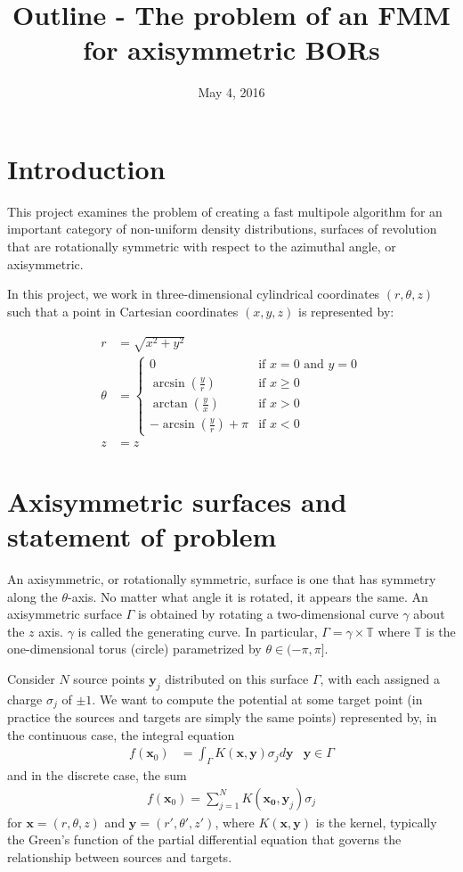 \documentclass[11pt, oneside]{article}   	%
\title{Outline - The problem of an FMM for axisymmetric BORs}
\date{May 4, 2016}
\begin{document}
\maketitle

\section{Introduction}
This project examines the problem of creating a fast multipole algorithm for an important category of non-uniform density distributions, surfaces of revolution that are rotationally symmetric with respect to the azimuthal angle, or axisymmetric.

In this project, we work in three-dimensional cylindrical coordinates $(r,\theta,z)$ such that a point in Cartesian coordinates $(x,y,z)$ is represented by:

\begin{align}
r &= \sqrt{x^2+y^2}\\
\theta &=   \begin{cases}
    0 & \mbox{if } x = 0 \mbox{ and } y = 0\\
    \arcsin(\frac{y}{r}) & \mbox{if } x \geq 0 \\	
    \arctan(\frac{y}{x}) & \mbox{if } x > 0 \\	
    -\arcsin(\frac{y}{r}) + \pi & \mbox{if } x < 0
  \end{cases}\\
z &= z
\end{align}

\section{Axisymmetric surfaces and statement of problem}

An axisymmetric, or rotationally symmetric, surface is one that has symmetry along the $\theta$-axis. No matter what angle it is rotated, it appears the same. An axisymmetric surface $\Gamma$ is obtained by rotating a two-dimensional curve $\gamma$ about the $z$ axis. $\gamma$ is called the generating curve. In particular, $\Gamma=\gamma\times\mathbb{T}$ where $\mathbb{T}$ is the one-dimensional torus (circle) parametrized by $\theta\in(-\pi,\pi]$.

Consider $N$ source points $\mathbf{y}_j$ distributed on this surface $\Gamma$, with each assigned a charge $\sigma_j$ of $\pm 1$. We want to compute the potential at some target point (in practice the sources and targets are simply the same points) represented by, in the continuous case, the integral equation
\begin{align}
f(\mathbf{x}_0) &= \int_\Gamma K(\mathbf{x},\mathbf{y})\sigma_jd\mathbf{y} &\mathbf{y}\in\Gamma
\end{align}
and in the discrete case, the sum
\begin{align}
f(\mathbf{x}_0) = \sum_{j=1}^N K(\mathbf{x_0},\mathbf{y}_j)\sigma_j
\end{align}
for $\mathbf{x}=(r,\theta,z)$ and $\mathbf{y}=(r',\theta',z')$, where $K(\mathbf{x},\mathbf{y})$ is the kernel, typically the Green's function of the partial differential equation that governs the relationship between sources and targets.
\end{document}
